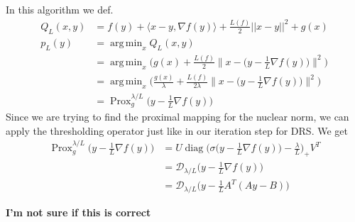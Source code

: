 \documentclass{article}
\numberwithin{equation}{section}
\DeclareMathOperator*{\argmin}{arg\,min}
\DeclareMathOperator{\Prox}{Prox}
\DeclareMathOperator{\diag}{diag}
\begin{document}
In this algorithm we def. 
\begin{align*}
Q_L(x,y) &= f(y) + \langle x-y, \nabla f(y) \rangle + \frac{L(f)}{2} ||x-y||^2 + g(x)\\
p_L(y) &= \argmin_x Q_L(x,y)\\
&= \argmin_x \Big( g(x) + \frac{L(f)}{2} \Big\| x - \Big( y - \frac{1}{L} \nabla f(y)\Big)\Big\|^2 \Big)\\
&= \argmin_x \Big( \frac{g(x)}{\lambda} + \frac{L(f)}{2\lambda} \Big\| x - \Big( y - \frac{1}{L} \nabla f(y)\Big)\Big\|^2 \Big)\\
&= \Prox_{g}^{\lambda/L} \Big(y - \frac{1}{L}\nabla f(y)\Big)
\end{align*}
Since we are trying to find the proximal mapping for the nuclear norm, we can apply the thresholding operator just like in our iteration step for DRS. We get 
\begin{align*}
\Prox_{g}^{\lambda/L}  \Big(y - \frac{1}{L} \nabla f(y) \Big) &= U \diag \Big(\sigma \Big(y - \frac{1}{L} \nabla f(y)\Big) - \frac{\lambda}{L}\Big)_+ V^T\\
&= \mathcal{D}_{\lambda / L}\Big(y - \frac{1}{L} \nabla f(y)\Big)\\
&= \mathcal{D}_{\lambda / L}\Big(y - \frac{1}{L} A^T(Ay - B)\Big)
\end{align*}

\textbf{I'm not sure if this is correct}
\end{document}
